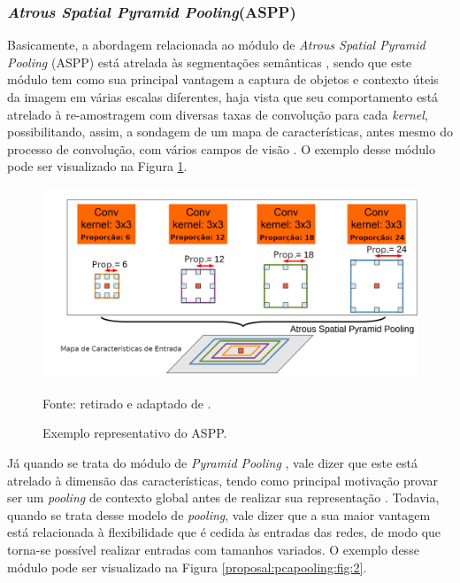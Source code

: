 \subsubsection{\textit{Atrous Spatial Pyramid Pooling}(ASPP)}
\label{cnn:pooling:aspp}
Basicamente, a abordagem relacionada ao módulo de \textit{Atrous Spatial Pyramid Pooling} (ASPP) \citep{Chen2018} está atrelada às segmentações semânticas \citep{Mohan2020}, sendo que este módulo tem como sua principal vantagem a captura de objetos e contexto úteis da imagem em várias escalas diferentes, haja vista que seu comportamento está atrelado à re-amostragem com diversas taxas de convolução para cada \textit{kernel}, possibilitando, assim, a sondagem de um mapa de características, antes mesmo do processo de convolução, com vários campos de visão \cite{Chen2018}. O exemplo desse módulo pode ser visualizado na Figura \ref{proposal:pcapooling:fig:1}.

\begin{figure}[H]
    \centering
    \caption{Exemplo representativo do ASPP.}
    \includegraphics[width=1\textwidth]{recursos/imagens/proposal/aspp.png}
    \label{proposal:pcapooling:fig:1}

    Fonte: retirado e adaptado de \cite{Chen2018}.
\end{figure}

Já quando se trata do módulo de \textit{Pyramid Pooling} \citep{Zhao2017}, vale dizer que este está atrelado à dimensão das características, tendo como principal motivação provar ser um \textit{pooling} de contexto global antes de realizar sua representação \cite{Zhao2017}. Todavia, quando se trata desse modelo de \textit{pooling}, vale dizer que a sua maior vantagem está relacionada à flexibilidade que é cedida às entradas das redes, de modo que torna-se possível realizar entradas com tamanhos variados. O exemplo desse módulo pode ser visualizado na Figura \ref{proposal:pcapooling:fig:2}.

